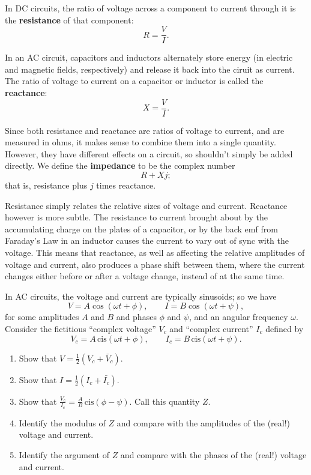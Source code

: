\documentclass{article}
\newcommand{\cis}{\,\mathrm{cis}}
\begin{document}
\vspace{5mm}

In DC circuits, the ratio of voltage across a component to current through it is the \textbf{resistance} of that component:
\[R=\frac{V}{I}.\]

In an AC circuit, capacitors and inductors alternately store energy (in electric and magnetic fields, respectively) and release it back into the ciruit as current. The ratio of voltage to current on a capacitor or inductor is called the \textbf{reactance}:
\[X=\frac{V}{I}.\]

Since both resistance and reactance are ratios of voltage to current, and are measured in ohms, it makes sense to combine them into a single quantity. However, they have different effects on a circuit, so shouldn't simply be added directly. We define the \textbf{impedance} to be the complex number
\[R+Xj;\]
that is, resistance plus $j$ times reactance.

Resistance simply relates the relative sizes of voltage and current. Reactance however is more subtle. The resistance to current brought about by the accumulating charge on the plates of a capacitor, or by the back emf from Faraday's Law in an inductor causes the current to vary out of sync with the voltage. This means that reactance, as well as affecting the relative amplitudes of voltage and current, also produces a phase shift between them, where the current changes either before or after a voltage change, instead of at the same time.\medskip



In AC circuits, the voltage and current are typically sinusoids; so we have
\[V=A\cos(\omega t + \phi),\qquad I=B\cos(\omega t+\psi),\]
for some amplitudes $A$ and $B$ and phases $\phi$ and $\psi$, and an angular frequency $\omega$. Consider the fictitious ``complex voltage'' $V_c$ and ``complex current'' $I_c$ defined by
\[V_c=A\cis(\omega t+\phi),\qquad I_c=B\cis(\omega t+\psi).\]
\begin{enumerate}
\item Show that $V=\frac{1}{2}(V_c+\bar{V}_c)$.
\item Show that $I=\frac{1}{2}(I_c+\bar{I_c})$.
\item Show that $\frac{V_c}{I_c}=\frac{A}{B}\cis(\phi-\psi)$. Call this quantity $Z$.
\item Identify the modulus of $Z$ and compare with the amplitudes of the (real!) voltage and current.
\item Identify the argument of $Z$ and compare with the phases of the (real!) voltage and current.
\end{enumerate}
\end{document}
